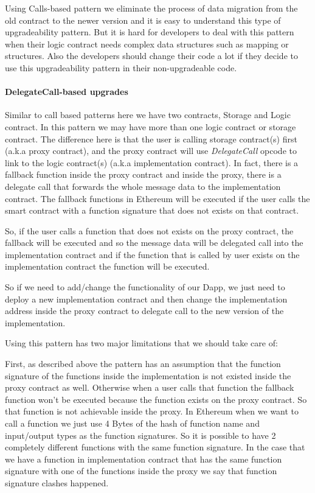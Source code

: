 Using Calls-based pattern we eliminate the process of data migration from the old contract to the newer version and it is easy to understand this type of upgradeability pattern. But it is hard for developers to deal with this pattern when their logic contract needs complex data structures such as mapping or structures. Also the developers should change their code a lot if they decide to use this upgradeability pattern in their non-upgradeable code. 


\paragraph{DelegateCall-based upgrades}
Similar to call based patterns here we have two contracts, Storage and Logic contract. In this pattern we may have more than one logic contract or storage contract. The difference here is that the user is calling storage contract(s) first (a.k.a proxy contract), and the proxy contract will use \textit{DelegateCall} opcode to link to the logic contract(s) (a.k.a implementation contract). In fact, there is a fallback function inside the proxy contract and inside the proxy, there is a delegate call that forwards the whole message data to the implementation contract.
The fallback functions in Ethereum will be executed if the user calls the smart contract with a function signature that does not exists on that contract.

So, if the user calls a function that does not exists on the proxy contract, the fallback will be executed and so the message data will be delegated call into the implementation contract and if the function that is called by user exists on the implementation contract the function will be executed.

So if we need to add/change the functionality of our Dapp, we just need to deploy a new implementation contract and then change the implementation address inside the proxy contract to delegate call to the new version of the implementation.

Using this pattern has two major limitations that we should take care of:

First, as described above the pattern has an assumption that the function signature of the functions inside the implementation is not existed inside the proxy contract as well. Otherwise when a user calls that function the fallback function won't be executed because the function exists on the proxy contract. So that function is not achievable inside the proxy. In Ethereum when we want to call a function we just use 4 Bytes of the hash of function name and input/output types as the function signatures. So it is possible to have 2 completely different functions with the same function signature. In the case that we have a function in implementation contract that has the same function signature with one of the functions inside the proxy we say that function signature clashes happened.

